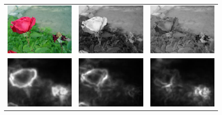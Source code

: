 \begin{figure}[t]
\begin{center}
\begin{tabular}{ccc}
\includegraphics[width=0.3\linewidth]{fig/2_75_75169.png} &
\includegraphics[width=0.3\linewidth]{fig/2_75_75169-sparse_dr.png} & 
\includegraphics[width=0.3\linewidth]{fig/2_75_75169-rgb2gray.png} \\
\includegraphics[width=0.3\linewidth]{fig/2_75_75169_SaliencyMap.jpg} &
\includegraphics[width=0.3\linewidth]{fig/2_75_75169-sparse_dr_SaliencyMap.jpg} & 
\includegraphics[width=0.3\linewidth]{fig/2_75_75169-rgb2gray_SaliencyMap.jpg} \\

\end{tabular}
\end{center}
\end{figure}
